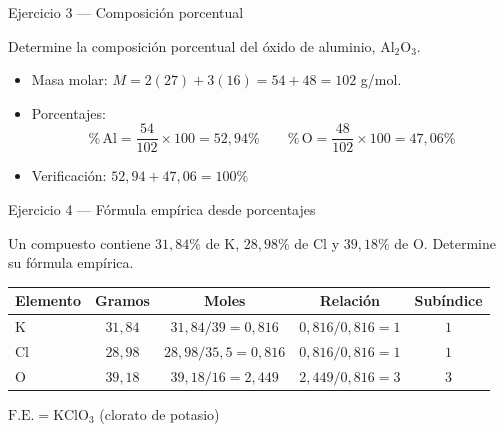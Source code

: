 \documentclass[aspectratio=169]{beamer}
\newcommand{\pc}{\text{\%}}
\begin{document}
\begin{frame}{Ejercicio 3 — Composición porcentual}
  \mwtopanchoroff
  \begin{mwejercicio}
    Determine la composición porcentual del óxido de aluminio, $\text{Al}_2\text{O}_3$.
  \end{mwejercicio}
  \vspace{2pt}
  \begin{mwpasos}[Resolución]
    \begin{itemize}
      \item Masa molar: $M = 2(27) + 3(16) = 54 + 48 = 102$ g/mol.
      \item Porcentajes:
            \[
              \pc\,\text{Al} = \frac{54}{102}\times100 = 52{,}94\pc
              \qquad
              \pc\,\text{O} = \frac{48}{102}\times100 = 47{,}06\pc
            \]
      \item Verificación: $52{,}94 + 47{,}06 = 100\pc$ \checkmark
    \end{itemize}
  \end{mwpasos}
  \mwtopanchoron
\end{frame}

\begin{frame}{Ejercicio 4 — Fórmula empírica desde porcentajes}
  \mwtopanchoroff
  \begin{mwejercicio}
    Un compuesto contiene $31{,}84\pc$ de K, $28{,}98\pc$ de Cl y $39{,}18\pc$ de O.
    Determine su fórmula empírica.
  \end{mwejercicio}
  \vspace{2pt}
  \begin{mwpasos}
    \centering
    \small
    \setlength{\tabcolsep}{4pt}
    \begin{tabular}{lcccc}
      \toprule
      Elemento & Gramos & Moles & Relación & Subíndice \\
      \midrule
      K  & $31{,}84$ & $31{,}84/39 = 0{,}816$    & $0{,}816/0{,}816 = 1$ & $1$ \\
      Cl & $28{,}98$ & $28{,}98/35{,}5 = 0{,}816$ & $0{,}816/0{,}816 = 1$ & $1$ \\
      O  & $39{,}18$ & $39{,}18/16 = 2{,}449$     & $2{,}449/0{,}816 = 3$ & $3$ \\
      \bottomrule
    \end{tabular}
    \par\vspace{4pt}
    $\text{F.E.} = \boxed{\text{KClO}_3}$ \quad (clorato de potasio)
  \end{mwpasos}
  \mwtopanchoron
\end{frame}
\end{document}
